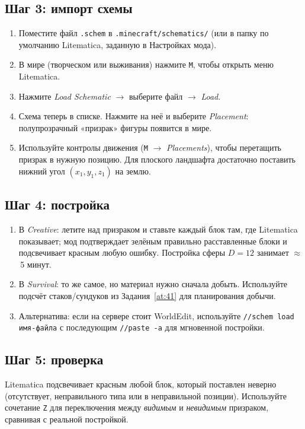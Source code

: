 \documentclass[12pt,a4paper]{scrartcl}
\newcommand{\cmd}[1]{\textcolor{earth}{\texttt{\small #1}}}
\begin{document}
\subsection{Шаг 3: импорт схемы}
\begin{enumerate}[leftmargin=1.5em,itemsep=0.15em,topsep=0.3em]
  \item Поместите файл \texttt{.schem} в \texttt{.minecraft/schematics/} (или в папку по умолчанию Litematica, заданную в Настройках мода).
  \item В мире (творческом или выживания) нажмите \texttt{M}, чтобы открыть меню Litematica.
  \item Нажмите \emph{Load Schematic} $\rightarrow$ выберите файл $\rightarrow$ \emph{Load}.
  \item Схема теперь в списке. Нажмите на неё и выберите \emph{Placement}: полупрозрачный «призрак» фигуры появится в мире.
  \item Используйте контролы движения (\texttt{M} $\rightarrow$ \emph{Placements}), чтобы перетащить призрак в нужную позицию. Для плоского ландшафта достаточно поставить нижний угол $(x_1, y_1, z_1)$ на землю.
\end{enumerate}

\subsection{Шаг 4: постройка}
\begin{enumerate}[leftmargin=1.5em,itemsep=0.15em,topsep=0.3em]
  \item В \emph{Creative}: летите над призраком и ставьте каждый блок там, где Litematica показывает; мод подтверждает зелёным правильно расставленные блоки и подсвечивает красным любую ошибку. Постройка сферы $D = 12$ занимает $\approx$\,5 минут.
  \item В \emph{Survival}: то же самое, но материал нужно сначала добыть. Используйте подсчёт стаков/сундуков из Задания~\ref{at:41} для планирования добычи.
  \item Альтернатива: если на сервере стоит WorldEdit, используйте \cmd{//schem load имя-файла} с последующим \cmd{//paste -a} для мгновенной постройки.
\end{enumerate}

\subsection{Шаг 5: проверка}
Litematica подсвечивает красным любой блок, который поставлен неверно (отсутствует, неправильного типа или в неправильной позиции). Используйте сочетание \texttt{Z} для переключения между \emph{видимым} и \emph{невидимым} призраком, сравнивая с реальной постройкой.
\end{document}

